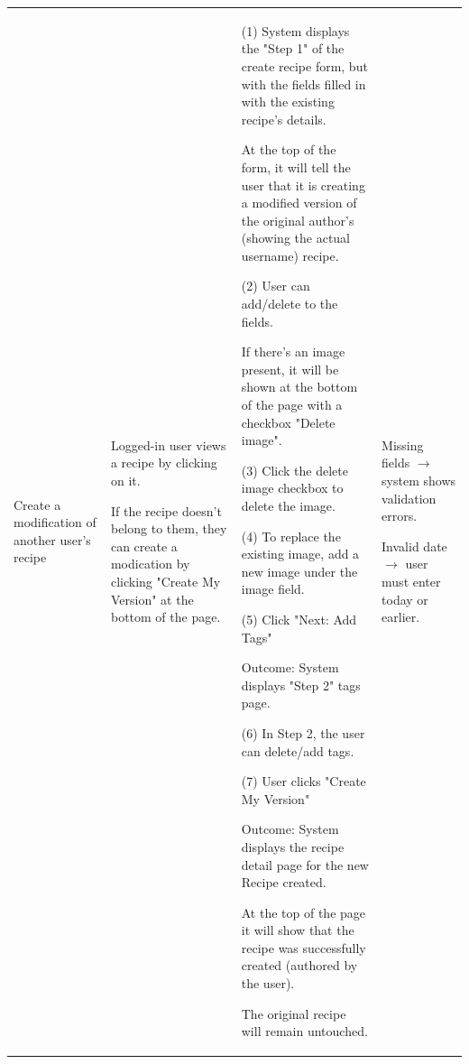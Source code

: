 \documentclass[10pt,a4paper]{article}
\begin{document}
\begin{longtable}{|p{30mm}|p{30mm}|p{40mm}|p{40mm}|}
\hline
Create a modification of another user's recipe
&
Logged-in user views a recipe by clicking on it.

If the recipe doesn't belong to them, they can create a modication by clicking "Create My Version" at the bottom of the page.
&
(1) System displays the "Step 1" of the create recipe form, but with the fields filled in with the existing recipe's details.

At the top of the form, it will tell the user that it is creating a modified version
of the original author's (showing the actual username) recipe.

\vspace{1 mm}

(2) User can add/delete to the fields.

If there's an image present, it will be shown at the bottom of the page with a checkbox "Delete image".

\vspace{1 mm}

(3) Click the delete image checkbox to delete the image.

\vspace{1 mm}

(4) To replace the existing image, add a new image under the image field.

\vspace{1 mm}

(5) Click "Next: Add Tags"

Outcome: System displays "Step 2" tags page.

\vspace{1 mm}

(6) In Step 2, the user can delete/add tags.

\vspace{1 mm}

(7) User clicks "Create My Version"

Outcome: System displays the recipe detail page for the new Recipe created.

At the top of the page it will show that the recipe was successfully created (authored by the user).

The original recipe will remain untouched.
&
Missing fields $\rightarrow$ system shows validation errors.

\vspace{1 mm}

Invalid date $\rightarrow$  user must enter today or earlier.

\vspace{1 mm}


\end{longtable}
\end{document}
